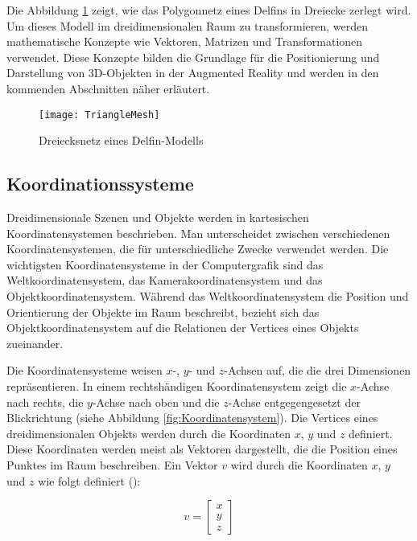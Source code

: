 Die Abbildung \ref{fig:TriangleMesh} zeigt, wie das Polygonnetz eines Delfins in Dreiecke zerlegt wird. Um dieses Modell im dreidimensionalen Raum zu transformieren, werden mathematische Konzepte wie Vektoren, Matrizen und Transformationen verwendet. Diese Konzepte bilden die Grundlage für die Positionierung und Darstellung von 3D-Objekten in der Augmented Reality und werden in den kommenden Abschnitten näher erläutert. \cite{wikipedia2023mesh, espinoza2024graphics}

\begin{figure}
    \centering
    \texttt{[image: TriangleMesh]}
    \caption{Dreiecksnetz eines Delfin-Modells \cite{wikipedia2023mesh}\label{fig:TriangleMesh}}\par
\end{figure}

\subsection{Koordinationssysteme}

Dreidimensionale Szenen und Objekte werden in kartesischen Koordinatensystemen beschrieben. Man unterscheidet zwischen verschiedenen Koordinatensystemen, die für unterschiedliche Zwecke verwendet werden. Die wichtigsten Koordinatensysteme in der Computergrafik sind das Weltkoordinatensystem, das Kamerakoordinatensystem und das Objektkoordinatensystem. Während das Weltkoordinatensystem die Position und Orientierung der Objekte im Raum beschreibt, bezieht sich das Objektkoordinatensystem auf die Relationen der Vertices eines Objekts zueinander. \cite{doerner2022virtual, gao2021vSLAM, usau2023appleARCamera}

Die Koordinatensysteme weisen \(x\)-, \(y\)- und \(z\)-Achsen auf, die die drei Dimensionen repräsentieren. In einem rechtshändigen Koordinatensystem zeigt die \(x\)-Achse nach rechts, die \(y\)-Achse nach oben und die \(z\)-Achse entgegengesetzt der Blickrichtung (siehe Abbildung \ref{fig:Koordinatensystem}). Die Vertices eines dreidimensionalen Objekts werden durch die Koordinaten \(x\), \(y\) und \(z\) definiert. Diese Koordinaten werden meist als Vektoren dargestellt, die die Position eines Punktes im Raum beschreiben. Ein Vektor \(v\) wird durch die Koordinaten \(x\), \(y\) und \(z\) wie folgt definiert (\cite{doerner2022virtual, gao2021vSLAM, freescale2010math3d, pezzi2021matrices}):

\begin{equation}
v = \begin{bmatrix} x \\ y \\ z \end{bmatrix}
\end{equation}

